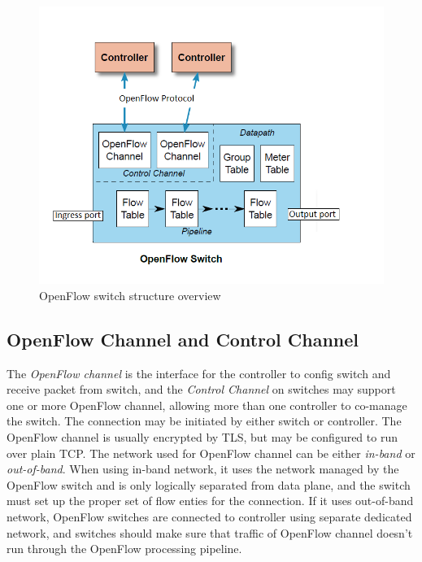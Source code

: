 \begin{figure}[H]
\begin{center} 
\includegraphics[width=1.1\textwidth]{figures/openflow_switch_overview.PNG}
\end{center}
\caption{OpenFlow switch structure overview}
\label{OF_OV}
\end{figure} 

\subsection{OpenFlow Channel and Control Channel}
\label{OpenFlow Channel and Control Channel}
The \textit{OpenFlow channel} is the interface for the controller to config switch and receive packet from switch, and the \textit{Control Channel} on switches may support one or more OpenFlow channel, allowing more than one controller to co-manage the switch. The connection may be initiated by either switch or controller. The OpenFlow channel is usually encrypted by TLS, but may be configured to run over plain TCP. The network used for OpenFlow channel can be either \textit{in-band} or \textit{out-of-band}. When using in-band network, it uses the network managed by the OpenFlow switch and is only logically separated from data plane, and the switch must set up the proper set of flow enties for the connection. If it uses out-of-band network, OpenFlow switches are connected to controller using separate dedicated network, and switches should make sure that traffic of OpenFlow channel doesn't run through the OpenFlow processing pipeline. \cite{OF_SPEC}

